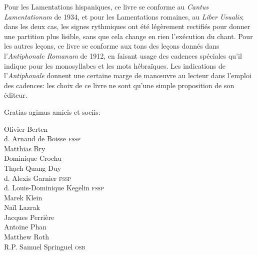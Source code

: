 \documentclass[11pt, twoside, french]{book}
\begin{document}
{\setlength{\parindent}{5mm}\small

Pour les Lamentations hispaniques, ce livre se conforme au \emph{Cantus Lamentationum} de 1934, et pour les Lamentations romaines, au \emph{Liber Usualis}; 
dans les deux cas, les signes rythmiques ont été légèrement rectifiés pour donner une partition plus lisible, sans que cela change en rien l'exécution du chant.
Pour les autres leçons, ce livre se conforme aux tons des leçons donnés dans l'\emph{Antiphonale Romanum} de 1912, en faisant usage des cadences spéciales qu'il indique pour les monosyllabes et les mots hébraïques. Les indications de l'\emph{Antiphonale} donnent une certaine marge de manœuvre au lecteur dans l'emploi des cadences: 
les choix de ce livre ne sont qu'une simple proposition de son éditeur.
}

\vfill
\null

\newpage

\vspace*{3cm}

\begin{center}

Gratias agimus amicis et sociis:

\vspace{5mm}

Olivier Berten\\
d. Arnaud de Boisse \textsc{fssp}\\
Matthias Bry\\
Dominique Crochu\\
Thạch Quang Duy\\
d. Alexis Garnier \textsc{fssp}\\
d. Louis-Dominique Kegelin \textsc{fssp}\\
Marek Klein\\
Naïl Lazrak\\
Jacques Perrière\\
Antoine Phan\\
Matthew Roth\\
R.P. Samuel Springuel \textsc{osb}\\

\end{center}

\newpage



\end{document}
